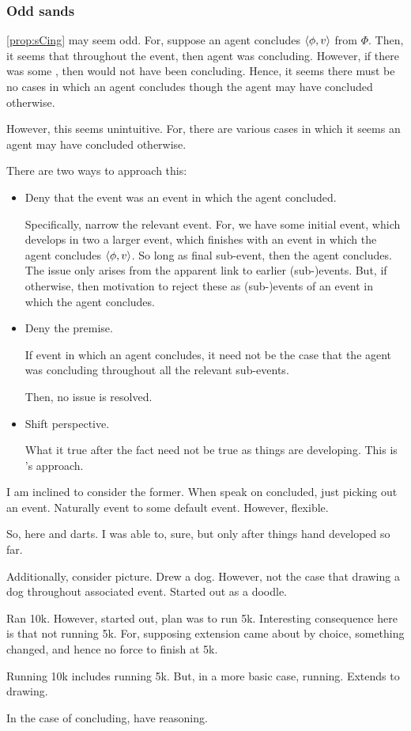 \subsubsection{Odd sands}

\begin{note}
  \autoref{prop:sCing} may seem odd.
  For, suppose an agent concludes \(\langle \phi, v \rangle\) from \(\Phi\).
  Then, it seems that throughout the event, then agent was concluding.
  However, if there was some \curb{}, then would not have been concluding.
  Hence, it seems there must be no cases in which an agent concludes though the agent may have concluded otherwise.

  However, this seems unintuitive.
  For, there are various cases in which it seems an agent may have concluded otherwise.

  There are two ways to approach this:
  \begin{itemize}
  \item
    Deny that the event was an event in which the agent concluded.

    Specifically, narrow the relevant event.
    For, we have some initial event, which develops in two a larger event, which finishes with an event in which the agent concludes \(\langle \phi, v \rangle\).
    So long as final sub-event, then the agent concludes.
    The issue only arises from the apparent link to earlier (sub-)events.
    But, if otherwise, then motivation to reject these as (sub-)events of an event in which the agent concludes.
  \item
    Deny the premise.

    If event in which an agent concludes, it need not be the case that the agent was concluding throughout all the relevant sub-events.

    Then, no issue is resolved.
  \item
    Shift perspective.

    What it true after the fact need not be true as things are developing.
    This is \citeauthor{Boylan:2020aa}'s approach.
  \end{itemize}

  I am inclined to consider the former.
  When speak on concluded, just picking out an event.
  Naturally event to some default event.
  However, flexible.

  So, here \citeauthor{Boylan:2020aa} and darts.
  I was able to, sure, but only after things hand developed so far.

  Additionally, consider picture.
  Drew a dog.
  However, not the case that drawing a dog throughout associated event.
  Started out as a doodle.

  Ran 10k.
  However, started out, plan was to run 5k.
  Interesting consequence here is that not running 5k.
  For, supposing extension came about by choice, something changed, and hence no force to finish at 5k.

  Running 10k includes running 5k.
  But, in a more basic case, running.
  Extends to drawing.

  In the case of concluding, have reasoning.
\end{note}

